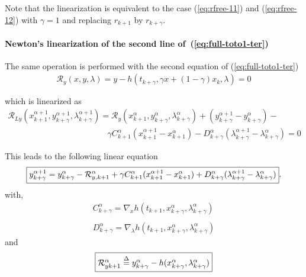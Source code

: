 Note that the linearization is equivalent to the case (\ref{eq:rfree-11}) and (\ref{eq:rfree-12}) with $\gamma=1$ and replacing $r_{k+1}$ by $r_{k+\gamma}$.

 \paragraph{Newton's linearization of the second  line of~(\ref{eq:full-toto1-ter})}
The same operation is performed with the second equation of (\ref{eq:full-toto1-ter})
\begin{equation}
  \begin{array}{l}
    \mathcal R_y(x,y,\lambda)=y-h(t_{k+\gamma},\gamma x + (1-\gamma) x_k ,\lambda) =0\\ \\
  \end{array}
\end{equation}
which is linearized as
\begin{equation}
  \label{eq:full-NL9}
  \begin{array}{l}
    \mathcal R_{Ly}(x^{\alpha+1}_{k+1},y^{\alpha+1}_{k+\gamma},\lambda^{\alpha+1}_{k+\gamma}) = \mathcal
    R_{y}(x^{\alpha}_{k+1},y^{\alpha}_{k+\gamma},\lambda^{\alpha}_{k+\gamma}) +
    (y^{\alpha+1}_{k+\gamma}-y^{\alpha}_{k+\gamma})- \\[2mm] \qquad  \qquad \qquad \qquad  \qquad \qquad
    \gamma C^{\alpha}_{k+1}(x^{\alpha+1}_{k+1}-x^{\alpha}_{k+1}) - D^{\alpha}_{k+\gamma}(\lambda^{\alpha+1}_{k+\gamma}-\lambda^{\alpha}_{k+\gamma})=0
  \end{array}
\end{equation}

This leads to the following linear equation
\begin{equation}
  \boxed{y^{\alpha+1}_{k+\gamma} =  y^{\alpha}_{k+\gamma}
  -\mathcal R^{\alpha}_{y,k+1}+ \\
  \gamma C^{\alpha}_{k+1}(x^{\alpha+1}_{k+1}-x^{\alpha}_{k+1}) +
  D^{\alpha}_{k+\gamma}(\lambda^{\alpha+1}_{k+\gamma}-\lambda^{\alpha}_{k+\gamma})}. \label{eq:full-NL11y}
\end{equation}
with,
\begin{equation}
     \begin{array}{l}
  C^{\alpha}_{k+\gamma} = \nabla_xh(t_{k+1}, x^{\alpha}_{k+\gamma},\lambda^{\alpha}_{k+\gamma} ) \\ \\
  D^{\alpha}_{k+\gamma} = \nabla_{\lambda}h(t_{k+1}, x^{\alpha}_{k+\gamma},\lambda^{\alpha}_{k+\gamma})
 \end{array}
\end{equation}
and
\begin{equation}\fbox{$
\mathcal R^{\alpha}_{yk+1} \stackrel{\Delta}{=} y^{\alpha}_{k+\gamma} - h(x^{\alpha}_{k+\gamma},\lambda^{\alpha}_{k+\gamma})$}
 \end{equation}

